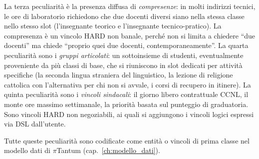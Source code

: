 La terza peculiarit\`a \`e la presenza diffusa di
\emph{compresenze}: in molti indirizzi tecnici, le ore di
laboratorio richiedono che due docenti diversi siano nella
stessa classe nello stesso slot (l'insegnante teorico e
l'insegnante tecnico-pratico). La compresenza \`e un vincolo
HARD non banale, perch\'e non si limita a chiedere ``due
docenti'' ma chiede ``proprio quei due docenti, contemporaneamente''.
La quarta peculiarit\`a sono i \emph{gruppi articolati}: un
sottoinsieme di studenti, eventualmente proveniente da pi\`u
classi di base, che si riuniscono in slot dedicati per
attivit\`a specifiche (la seconda lingua straniera del
linguistico, la lezione di religione cattolica con
l'alternativa per chi non si avvale, i corsi di recupero in
itinere). La quinta peculiarit\`a sono i \emph{vincoli
sindacali}: il giorno libero contrattuale CCNL, il monte ore
massimo settimanale, la priorit\`a basata sul punteggio di
graduatoria. Sono vincoli HARD non negoziabili, ai quali si
aggiungono i vincoli logici espressi via DSL dall'utente.

Tutte queste peculiarit\`a sono codificate come entit\`a o
vincoli di prima classe nel modello dati di $\pi$Tantum
(cap.~\ref{ch:modello_dati}).
